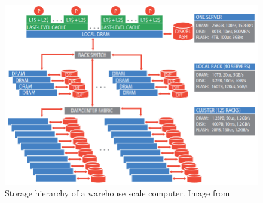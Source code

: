 \begin{figure} [!h]
\centering
\includegraphics[scale=.35]{methodology/images/cluster_storage_hierarchy.png}
\caption[Cluster Storage Hierarchy]{Storage hierarchy of a warehouse scale computer.  Image from \cite{barroso18}}
\label{img_cluster_storage_hierarchy}
\end{figure}